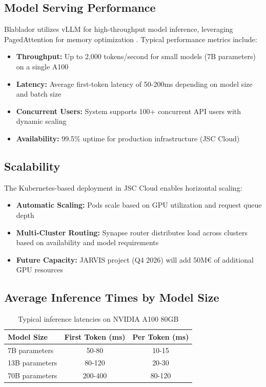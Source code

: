 \documentclass[10pt,conference]{IEEEtran}
\begin{document}
\subsection{Model Serving Performance}

Blablador utilizes vLLM for high-throughput model inference, leveraging PagedAttention for memory optimization \cite{vllm}. Typical performance metrics include:

\begin{itemize}
    \item \textbf{Throughput:} Up to 2,000 tokens/second for small models (7B parameters) on a single A100
    \item \textbf{Latency:} Average first-token latency of 50-200ms depending on model size and batch size
    \item \textbf{Concurrent Users:} System supports 100+ concurrent API users with dynamic scaling
    \item \textbf{Availability:} 99.5\% uptime for production infrastructure (JSC Cloud)
\end{itemize}

\subsection{Scalability}

The Kubernetes-based deployment in JSC Cloud enables horizontal scaling:

\begin{itemize}
    \item \textbf{Automatic Scaling:} Pods scale based on GPU utilization and request queue depth
    \item \textbf{Multi-Cluster Routing:} Synapse router distributes load across clusters based on availability and model requirements
    \item \textbf{Future Capacity:} JARVIS project (Q4 2026) will add 50M€ of additional GPU resources
\end{itemize}

\subsection{Average Inference Times by Model Size}

\begin{table}[h!]
\centering
\begin{tabular}{|l|c|c|}
\hline
\textbf{Model Size} & \textbf{First Token (ms)} & \textbf{Per Token (ms)} \\
\hline
7B parameters & 50-80 & 10-15 \\
13B parameters & 80-120 & 20-30 \\
70B parameters & 200-400 & 80-120 \\
\hline
\end{tabular}
\caption{Typical inference latencies on NVIDIA A100 80GB}
\label{tab:inference_latency}
\end{table}
\end{document}
